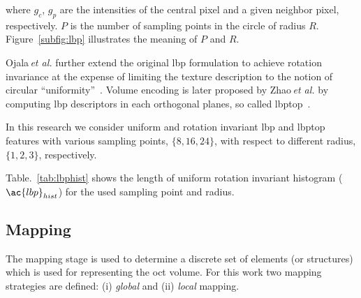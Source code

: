 \noindent where $g_c$, $g_{p}$ are the intensities of the central pixel and a given neighbor pixel, respectively. $P$ is the number of sampling points in the circle of radius $R$. Figure~\ref{subfig:lbp} illustrates the meaning of $P$ and $R$.

Ojala\,\textit{et al.} further extend the original \ac{lbp} formulation to achieve rotation invariance at the expense of limiting the texture description to the notion of circular ``uniformity''~\cite{ojala2002multiresolution}.
Volume encoding is later proposed by Zhao\,\textit{et al.} by computing \ac{lbp} descriptors in each orthogonal planes, so called \ac{lbptop}~\cite{zhao2012rotation}.

In this research we consider uniform and rotation invariant \ac{lbp} and \ac{lbptop} features with various sampling points, $\{8,16,24\}$, with respect to different radius, $\{1,2,3\}$, respectively.

Table.~\ref{tab:lbphist} shows the length of uniform rotation invariant histogram ($\ac{lbp}_{hist}$) for the used sampling point and radius.
\begin{table}
\caption{length of $\ac{lbp}_{hist}$ for different sampling points and radius ($\{S,R\}$) in \ac{lbp} descriptor}
\label{tab:lbphist}
\end{table}

\subsection{Mapping} \label{subsec:mapping}
The mapping stage is used to determine a discrete set of elements (or structures) which is used for representing the \ac{oct} volume.
For this work two mapping strategies are defined: (i) \emph{global} and (ii) \emph{local} mapping.

